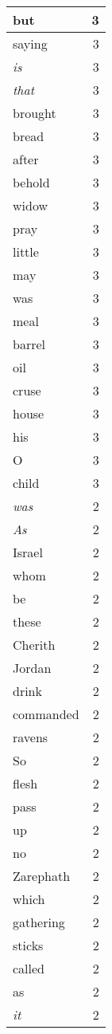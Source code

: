 \begin{center}
\begin{longtable}{l|r}
but & 3\\ \hline 
saying & 3\\ \hline 
\emph{is} & 3\\ \hline 
\emph{that} & 3\\ \hline 
brought & 3\\ \hline 
bread & 3\\ \hline 
after & 3\\ \hline 
behold & 3\\ \hline 
widow & 3\\ \hline 
pray & 3\\ \hline 
little & 3\\ \hline 
may & 3\\ \hline 
was & 3\\ \hline 
meal & 3\\ \hline 
barrel & 3\\ \hline 
oil & 3\\ \hline 
cruse & 3\\ \hline 
house & 3\\ \hline 
his & 3\\ \hline 
O & 3\\ \hline 
child & 3\\ \hline 
\emph{was} & 2\\ \hline 
\emph{As} & 2\\ \hline 
Israel & 2\\ \hline 
whom & 2\\ \hline 
be & 2\\ \hline 
these & 2\\ \hline 
Cherith & 2\\ \hline 
Jordan & 2\\ \hline 
drink & 2\\ \hline 
commanded & 2\\ \hline 
ravens & 2\\ \hline 
So & 2\\ \hline 
flesh & 2\\ \hline 
pass & 2\\ \hline 
up & 2\\ \hline 
no & 2\\ \hline 
Zarephath & 2\\ \hline 
which & 2\\ \hline 
gathering & 2\\ \hline 
sticks & 2\\ \hline 
called & 2\\ \hline 
as & 2\\ \hline 
\emph{it} & 2\\ \hline 

\end{longtable}
\end{center}
